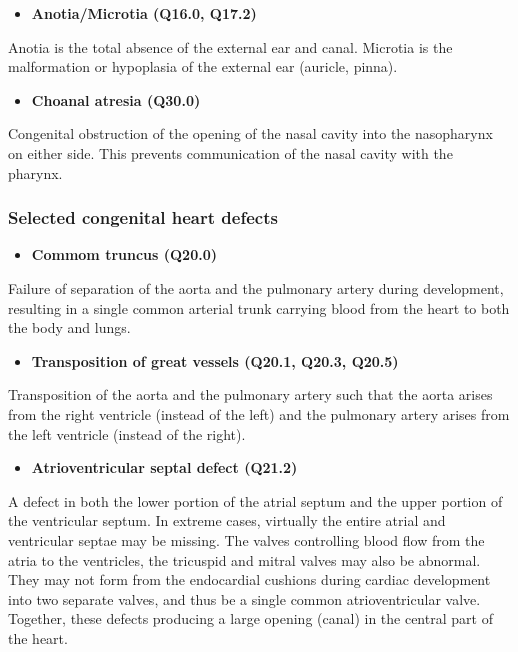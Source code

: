 \documentclass[
]{krantz}
\providecommand{\tightlist}{%
  \setlength{\itemsep}{0pt}\setlength{\parskip}{0pt}}
\begin{document}
\begin{itemize}
\tightlist
\item
  \textbf{Anotia/Microtia (Q16.0, Q17.2)}
\end{itemize}

Anotia is the total absence of the external ear and canal. Microtia is the malformation or hypoplasia of the external ear (auricle, pinna).

\begin{itemize}
\tightlist
\item
  \textbf{Choanal atresia (Q30.0)}
\end{itemize}

Congenital obstruction of the opening of the nasal cavity into the nasopharynx on either side. This prevents communication of the nasal cavity with the pharynx.

\hypertarget{section2114}{%
\subsubsection{Selected congenital heart defects}\label{section2114}}

\begin{itemize}
\tightlist
\item
  \textbf{Commom truncus (Q20.0)}
\end{itemize}

Failure of separation of the aorta and the pulmonary artery during development, resulting in a single common arterial trunk carrying blood from the heart to both the body and lungs.

\begin{itemize}
\tightlist
\item
  \textbf{Transposition of great vessels (Q20.1, Q20.3, Q20.5)}
\end{itemize}

Transposition of the aorta and the pulmonary artery such that the aorta arises
from the right ventricle (instead of the left) and the pulmonary artery arises from the left ventricle (instead of the right).

\begin{itemize}
\tightlist
\item
  \textbf{Atrioventricular septal defect (Q21.2)}
\end{itemize}

A defect in both the lower portion of the atrial septum and the upper portion of the ventricular septum. In extreme cases, virtually the entire atrial and ventricular septae may be missing. The valves controlling blood flow from the atria to the ventricles, the tricuspid and mitral valves may also be abnormal. They may not form from the endocardial cushions during cardiac development into two separate valves, and thus be a single common atrioventricular valve. Together, these defects producing a large opening (canal) in the central part of the heart.
\end{document}
